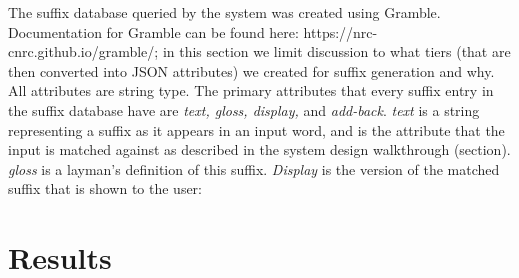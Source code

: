 \documentclass[11pt]{article}
\begin{document}
The suffix database queried by the system was created using Gramble. 
Documentation for Gramble can be found here: https://nrc-cnrc.github.io/gramble/; 
in this section we limit discussion to what tiers (that are then converted into JSON attributes) 
we created for suffix generation and why. All attributes are string type.
The primary attributes that every suffix entry in the suffix database have are 
\textit{text, gloss, display,} and \textit{add-back}. \textit{text} is a string representing a suffix 
as it appears in an input word, and is the attribute that the input is 
matched against as described in the system design walkthrough (section). 
\textit{gloss} is a layman’s definition of this suffix.
\textit{Display} is the version of the matched suffix that is shown to the user: 

\section{Results}
\end{document}
